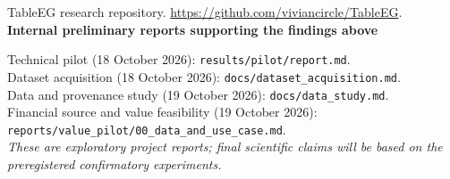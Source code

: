 \documentclass[10pt,a4paper]{article}
\begin{document}
\noindent [10] TableEG research repository. \url{https://github.com/viviancircle/TableEG}.\\[3pt]
\noindent\textbf{Internal preliminary reports supporting the findings above}\par
\noindent Technical pilot (18 October 2026): \texttt{results/pilot/report.md}.\\
Dataset acquisition (18 October 2026): \texttt{docs/dataset\_acquisition.md}.\\
Data and provenance study (19 October 2026): \texttt{docs/data\_study.md}.\\
Financial source and value feasibility (19 October 2026): \texttt{reports/value\_pilot/00\_data\_and\_use\_case.md}.\\
\emph{These are exploratory project reports; final scientific claims will be based on the preregistered confirmatory experiments.}
\endgroup
\end{document}
